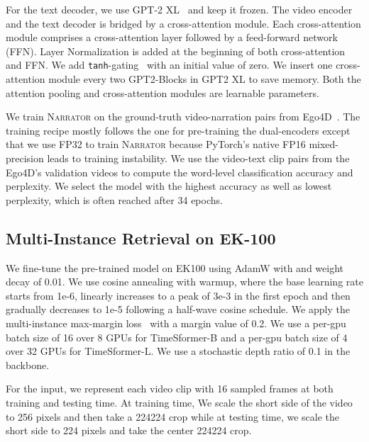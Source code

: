 \documentclass[10pt,twocolumn,letterpaper]{article}
\newcommand{\narrator}{\textsc{Narrator}\xspace}
\begin{document}
For the text decoder, we use GPT-2 XL~\cite{radford2019gpt2} and keep it frozen.
The video encoder and the text decoder is bridged by a cross-attention module.
Each cross-attention module comprises a cross-attention layer followed by a feed-forward network (FFN).
Layer Normalization is added at the beginning of both cross-attention and FFN.
We add \texttt{tanh}-gating~\cite{hochreiter1997lstm} with an initial value of zero.
We insert one cross-attention module every two GPT2-Blocks in GPT2 XL to save memory.
Both the attention pooling and cross-attention modules are learnable parameters.

We train \narrator on the ground-truth video-narration pairs from Ego4D~\cite{grauman2022ego4d}.
The training recipe mostly follows the one for pre-training the dual-encoders except that we use FP32 to train \narrator because PyTorch's native FP16 mixed-precision leads to training instability.
We use the video-text clip pairs from the Ego4D's validation videos to compute the word-level classification accuracy and perplexity.
We select the model with the highest accuracy as well as lowest perplexity, which is often reached after 34 epochs.

\subsection{Multi-Instance Retrieval on EK-100}
We fine-tune the pre-trained model on EK100 using AdamW with  and weight decay of 0.01.
We use cosine annealing with warmup, where the base learning rate starts from 1e-6, linearly increases to a peak of 3e-3 in the first epoch and then gradually decreases to 1e-5 following a half-wave cosine schedule.
We apply the multi-instance max-margin loss~\cite{wray2019jpose} with a margin value of 0.2.
We use a per-gpu batch size of 16 over 8 GPUs for TimeSformer-B and a per-gpu batch size of 4 over 32 GPUs for TimeSformer-L.
We use a stochastic depth ratio of 0.1 in the backbone.

For the input, we represent each video clip with 16 sampled frames at both training and testing time.
At training time, We scale the short side of the video to 256 pixels and then take a 224224 crop while at testing time, we scale the short side to 224 pixels and take the center 224224 crop.
\end{document}
